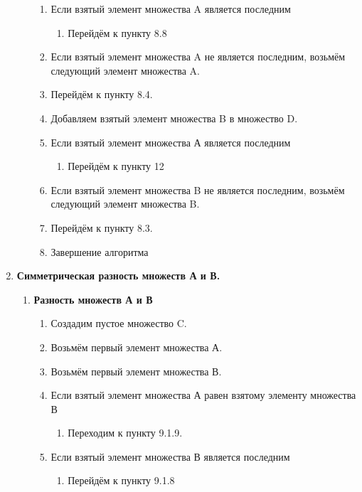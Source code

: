 \documentclass[a4paper,12pt]{extarticle}
\begin{document}
\begin{enumerate}
\begin{enumerate}[label*=\arabic*.]
\begin{enumerate}[label*=\arabic*.]
    \item Если взятый элемент множества A является последним
    \begin{enumerate}[label*=\arabic*.]
      \item Перейдём к пункту 8.8
    \end{enumerate}
    \item Если взятый элемент множества A не является последним, возьмём следующий элемент множества A.
    \item Перейдём к пункту 8.4.
    \item Добавляем взятый элемент множества B в множество D.
    \item Если взятый элемент множества А является последним
    \begin{enumerate}[label*=\arabic*.]
      \item Перейдём к пункту 12
    \end{enumerate}
    \item Если взятый элемент множества B не является последним, возьмём следующий элемент множества B.
    \item Перейдём к пункту 8.3.
    \item Завершение алгоритма
  \end{enumerate}
  \end{enumerate}
  \item \textbf{Симметрическая разность множеств А и В.}
  \begin{enumerate}[label*=\arabic*.]
    \item \textbf{Разность множеств А и В}
    \begin{enumerate}[label*=\arabic*.]
      \item Создадим пустое множество C.
      \item Возьмём первый элемент множества А.
      \item Возьмём первый элемент множества В.
      \item Если взятый элемент множества А равен взятому элементу множества В
      \begin{enumerate}[label*=\arabic*.]
        \item Переходим к пункту 9.1.9.
      \end{enumerate}
      \item Если взятый элемент множества В является последним
      \begin{enumerate}[label*=\arabic*.]
        \item Перейдём к пункту 9.1.8
      \end{enumerate}

\end{enumerate}
\end{enumerate}
\end{enumerate}
\end{document}
